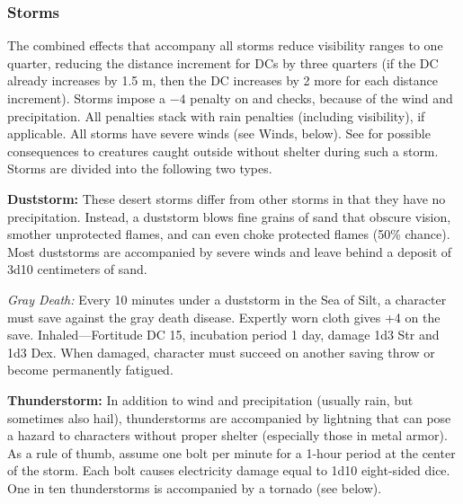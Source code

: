 \subsubsection{Storms}
The combined effects that accompany all storms reduce visibility ranges to one quarter, reducing the distance increment for  DCs by three quarters (if the DC already increases by 1.5 m, then the DC increases by 2 more for each distance increment). Storms impose a $-4$ penalty on  and  checks, because of the wind and precipitation. All penalties stack with rain penalties (including visibility), if applicable. All storms have severe winds (see Winds, below). See  for possible consequences to creatures caught outside without shelter during such a storm. Storms are divided into the following two types.

\textbf{Duststorm:} These desert storms differ from other storms in that they have no precipitation. Instead, a duststorm blows fine grains of sand that obscure vision, smother unprotected flames, and can even choke protected flames (50\% chance). Most duststorms are accompanied by severe winds and leave behind a deposit of 3d10 centimeters of sand.

\textit{Gray Death:} Every 10 minutes under a duststorm in the Sea of Silt, a character must save against the gray death disease. Expertly worn cloth gives +4 on the save. Inhaled---Fortitude DC 15, incubation period 1 day, damage 1d3 Str and 1d3 Dex. When damaged, character must succeed on another saving throw or become permanently fatigued.

\textbf{Thunderstorm:} In addition to wind and precipitation (usually rain, but sometimes also hail), thunderstorms are accompanied by lightning that can pose a hazard to characters without proper shelter (especially those in metal armor). As a rule of thumb, assume one bolt per minute for a 1-hour period at the center of the storm. Each bolt causes electricity damage equal to 1d10 eight-sided dice. One in ten thunderstorms is accompanied by a tornado (see below).

